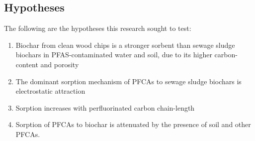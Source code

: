 \subsection{Hypotheses}\label{sec:hypotheis}
The following are the hypotheses this research sought to test:  
\begin{enumerate}[label=\roman*]
    \item Biochar from clean wood chips is a stronger sorbent than sewage sludge biochars in PFAS-contaminated water and soil, due to its higher carbon-content and porosity
    \item The dominant sorption mechanism of PFCAs to sewage sludge biochars is electrostatic attraction
    \item Sorption increases with perfluorinated carbon chain-length
    \item Sorption of PFCAs to biochar is attenuated by the presence of soil and other PFCAs. 
\end{enumerate}






